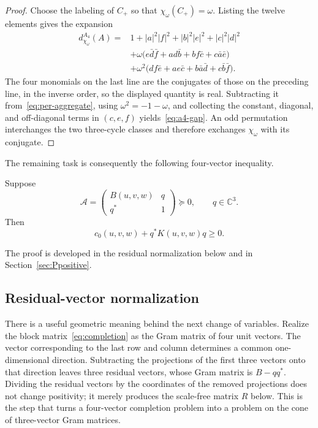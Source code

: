 \documentclass[10pt,twoside]{siamart1116}
\newcommand{\CC}{\mathbb C}
\newcommand{\mat}[1]{\begin{pmatrix}#1\end{pmatrix}}
\newcommand{\psd}{\succeq 0}
\begin{document}
\begin{proof}
Choose the labeling of $C_+$ so that $\chi_\omega(C_+)=\omega$.  Listing the
twelve elements gives the expansion
\begin{align*}
d_{\chi_\omega}^{A_4}(A)
={}&1+|a|^2|f|^2+|b|^2|e|^2+|c|^2|d|^2\\
&+\omega\bigl(e\bar d\bar f+ad\bar b+bf\bar c+c\bar a\bar e\bigr)\\
&+\omega^2\bigl(df\bar e+ae\bar c+b\bar a\bar d+c\bar b\bar f\bigr).
\end{align*}
The four monomials on the last line are the conjugates of those on the
preceding line, in the inverse order, so the displayed quantity is real.
Subtracting it from~\eqref{eq:per-aggregate}, using
$\omega^2=-1-\omega$, and collecting the constant, diagonal, and off-diagonal
terms in $(c,e,f)$ yields~\eqref{eq:a4-gap}.  An odd permutation interchanges
the two three-cycle classes and therefore exchanges $\chi_\omega$ with its
conjugate.
\end{proof}

The remaining task is consequently the following four-vector inequality.

\begin{theorem}\label{thm:four-vector}
Suppose
\begin{equation}\label{eq:completion}
 \mathcal A=\mat{B(u,v,w)&q\\q^*&1}\psd,\qquad q\in\CC^3.
\end{equation}
Then
\begin{equation}\label{eq:four-vector}
 c_0(u,v,w)+q^*K(u,v,w)q\geq0.
\end{equation}
\end{theorem}

The proof is developed in the residual normalization below and in
Section~\ref{sec:Ppositive}.

\subsection{Residual-vector normalization}\label{sec:normalization}

There is a useful geometric meaning behind the next change of variables.
Realize the block matrix~\eqref{eq:completion} as the Gram matrix of four unit
vectors.  The vector corresponding to the last row and column determines a
common one-dimensional direction.  Subtracting the projections of the first
three vectors onto that direction leaves three residual vectors, whose Gram
matrix is $B-qq^*$.  Dividing the residual vectors by the coordinates of the
removed projections does not change positivity; it merely produces the
scale-free matrix $R$ below.  This is the step that turns a four-vector
completion problem into a problem on the cone of three-vector Gram matrices.
\end{document}
